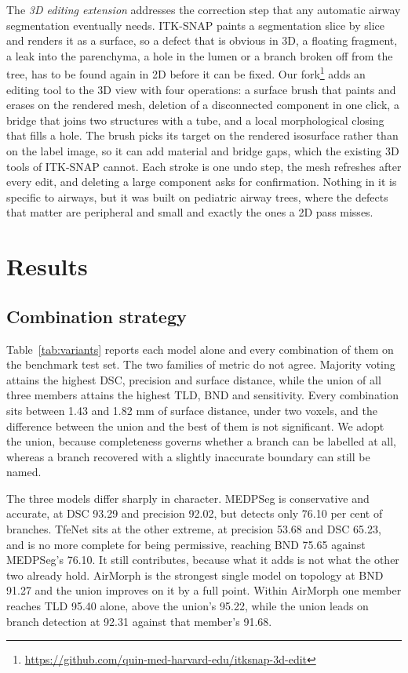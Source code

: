 \documentclass[runningheads]{llncs}
\begin{document}
The \emph{3D editing extension} addresses the correction step that any
automatic airway segmentation eventually needs. ITK-SNAP paints a
segmentation slice by slice and renders it as a surface, so a defect that is
obvious in 3D, a floating fragment, a leak into the parenchyma, a hole in the
lumen or a branch broken off from the tree, has to be found again in 2D before
it can be fixed. Our fork\footnote{\url{https://github.com/quin-med-harvard-edu/itksnap-3d-edit}}
adds an editing tool to the 3D view with four operations: a surface brush that
paints and erases on the rendered mesh, deletion of a disconnected component
in one click, a bridge that joins two structures with a tube, and a local
morphological closing that fills a hole. The brush picks its target on the
rendered isosurface rather than on the label image, so it can add material and
bridge gaps, which the existing 3D tools of ITK-SNAP cannot. Each stroke is
one undo step, the mesh refreshes after every edit, and deleting a large
component asks for confirmation. Nothing in it is specific to airways, but it
was built on pediatric airway trees, where the defects that matter are
peripheral and small and exactly the ones a 2D pass misses.

\section{Results}
\label{sec:results}

\subsection{Combination strategy}
Table~\ref{tab:variants} reports each model alone and every combination of them
on the benchmark test set. The two families of metric do not agree. Majority
voting attains the highest DSC, precision and surface distance, while the union
of all three members attains the highest TLD, BND and sensitivity. Every
combination sits between 1.43 and 1.82 mm of surface distance, under two voxels,
and the difference between the union and the best of them is not significant. We adopt the union,
because completeness governs whether a branch can be labelled at all, whereas a
branch recovered with a slightly inaccurate boundary can still be named.

The three models differ sharply in character. MEDPSeg is conservative and
accurate, at DSC 93.29 and precision 92.02, but detects only 76.10 per cent of
branches. TfeNet sits at the other extreme, at precision 53.68 and DSC 65.23,
and is no more complete for being permissive, reaching BND 75.65 against
MEDPSeg's 76.10. It still contributes, because what it adds is not what the
other two already hold. AirMorph is the strongest single model on topology at
BND 91.27 and the union improves on it by a full point. Within AirMorph one
member reaches TLD 95.40 alone, above the union's 95.22, while the union leads
on branch detection at 92.31 against that member's 91.68.
\end{document}
